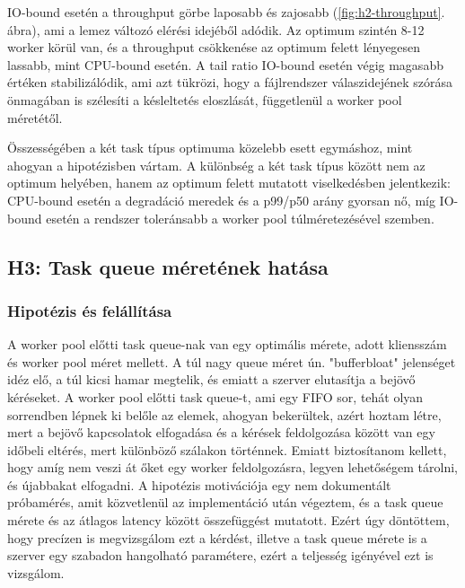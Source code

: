\documentclass[11pt,a4paper]{article}
\begin{document}
IO-bound esetén a throughput görbe laposabb és zajosabb (\ref{fig:h2-throughput}.
ábra), ami a lemez változó elérési idejéből adódik. Az optimum szintén
8-12 worker körül van, és a throughput csökkenése az optimum felett lényegesen lassabb,
mint CPU-bound esetén. A tail ratio IO-bound esetén végig magasabb értéken
stabilizálódik, ami azt tükrözi, hogy a fájlrendszer válaszidejének szórása
önmagában is szélesíti a késleltetés eloszlását, függetlenül a worker pool méretétől.


Összességében a két task típus optimuma közelebb esett egymáshoz, mint ahogyan a hipotézisben
vártam. A különbség a két task típus között nem az optimum helyében, hanem az
optimum felett mutatott viselkedésben jelentkezik: CPU-bound esetén a degradáció
meredek és a p99/p50 arány gyorsan nő, míg IO-bound esetén a rendszer toleránsabb
a worker pool túlméretezésével szemben.

\subsection{H3: Task queue méretének hatása}
\label{ssec:h3}



\subsubsection{Hipotézis és felállítása}
\label{sssec:h3-hipotezis}


A worker pool előtti task queue-nak van egy optimális mérete, adott kliensszám és worker pool méret mellett. 
A túl nagy queue méret ún. "bufferbloat" jelenséget idéz elő, a túl kicsi hamar megtelik, és emiatt a szerver elutasítja a bejövő kéréseket.
A worker pool előtti task queue-t, ami egy FIFO sor, tehát olyan sorrendben lépnek ki belőle az elemek, ahogyan bekerültek,
azért hoztam létre, mert a bejövő kapcsolatok elfogadása és a kérések feldolgozása között van egy időbeli eltérés, mert különböző szálakon történnek.
Emiatt biztosítanom kellett, hogy amíg nem veszi át őket egy worker feldolgozásra, legyen lehetőségem tárolni, és újabbakat elfogadni.
A hipotézis motivációja egy nem dokumentált próbamérés, amit közvetlenül az implementáció után végeztem, és a
task queue mérete és az átlagos latency között összefüggést mutatott. Ezért úgy döntöttem, hogy precízen is megvizsgálom ezt a kérdést,
illetve a task queue mérete is a szerver egy szabadon hangolható paramétere, ezért a teljesség igényével ezt is vizsgálom.
\end{document}
